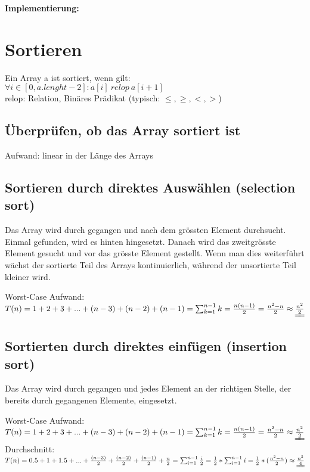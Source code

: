 \documentclass[a4paper,10pt]{article}
\newcommand{\Bold}[1]{\textbf{#1}} %
\begin{document}
\pagebreak
\Bold{Implementierung:}


\pagebreak
\section{Sortieren}
Ein Array a ist sortiert, wenn gilt: \\
$ \forall i \in [0, a.lenght-2] : a[i]\ relop\ a[i+1]$ \\
relop: Relation, Bin\"ares Pr\"adikat (typisch: $\leq,\geq,<,>$)

\subsection{\"Uberpr\"ufen, ob das Array sortiert ist}

Aufwand: linear in der L\"ange des Arrays \\

\subsection{Sortieren durch direktes Ausw\"ahlen (selection sort)}
Das Array wird durch gegangen und nach dem gr\"ossten Element durchsucht. Einmal gefunden, wird es hinten hingesetzt. Danach wird das zweitgr\"osste Element gesucht und vor das gr\"osste Element gestellt. Wenn man dies weiterf\"uhrt w\"achst der sortierte Teil des Arrays kontinuierlich, w\"ahrend der unsortierte Teil kleiner wird.

Worst-Case Aufwand: $T(n)=1+2+3+...+(n-3)+(n-2)+(n-1)=\sum_{k=1}^{n-1} k=\frac{n(n-1)}{2}=\frac{n^2-n}{2}\approx\uuline{\frac{n^2}{2}}$

\subsection{Sortierten durch direktes einf\"ugen (insertion sort)}
Das Array wird durch gegangen und jedes Element an der richtigen Stelle, der bereits durch gegangenen Elemente, eingesetzt.

Worst-Case Aufwand: $T(n)=1+2+3+...+(n-3)+(n-2)+(n-1)=\sum^{n-1}_{k=1} k=\frac{n(n-1)}{2}=\frac{n^2-n}{2}\approx\uuline{\frac{n^2}{2}}$
Durchschnitt: $T(n)=0.5 + 1 + 1.5 + ... + \frac{(n-3)}{2} + \frac{(n-2)}{2} + \frac{(n-1)}{2}  + \frac{n}{2}=\sum^{n-1}_{i=1} \frac{i}{2}=\frac{1}{2}*\sum^{n-1}_{i=1} i = \frac{1}{2}*(\frac{n^2-n}{2})\approx\uuline{\frac{n^2}{4}}$
\end{document}

